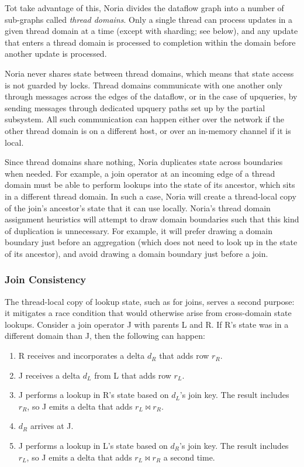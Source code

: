 Tot take advantage of this, Noria divides the dataflow graph into a number of
sub-graphs called \textit{thread domains}. Only a single thread can process
updates in a given thread domain at a time (except with sharding; see below),
and any update that enters a thread domain is processed to completion within
the domain before another update is processed.

Noria never shares state between thread domains, which means that state access
is not guarded by locks. Thread domains communicate with one another only
through messages across the edges of the dataflow, or in the case of upqueries,
by sending messages through dedicated upquery paths set up by the partial
subsystem. All such communication can happen either over the network if the
other thread domain is on a different host, or over an in-memory channel if it
is local.

Since thread domains share nothing, Noria duplicates state across boundaries
when needed. For example, a join operator at an incoming edge of a thread domain
must be able to perform lookups into the state of its ancestor, which sits in a
different thread domain. In such a case, Noria will create a thread-local copy
of the join's ancestor's state that it can use locally. Noria's thread domain
assignment heuristics will attempt to draw domain boundaries  such that this
kind of duplication is unnecessary. For example, it will prefer drawing a domain
boundary just before an aggregation (which does not need to look up in the state
of its ancestor), and avoid drawing a domain boundary just before a join.

\subsubsection{Join Consistency}
\label{s:join-state-dupe}

The thread-local copy of lookup state, such as for joins, serves a second
purpose: it mitigates a race condition that would otherwise arise from
cross-domain state lookups. Consider a join operator J with parents L and R. If
R's state was in a different domain than J, then the following can happen:

\begin{enumerate}
  \item R receives and incorporates a delta $d_R$ that adds row $r_R$.
  \item J receives a delta $d_L$ from L that adds row $r_L$.
  \item J performs a lookup in R's state based on $d_L$'s join key. The result
    includes $r_R$, so J emits a delta that adds $r_L \bowtie r_R$.
  \item $d_R$ arrives at J.
  \item J performs a lookup in L's state based on $d_R$'s join key. The result
    includes $r_L$, so J emits a delta that adds $r_L \bowtie r_R$ a second
    time.
\end{enumerate}

